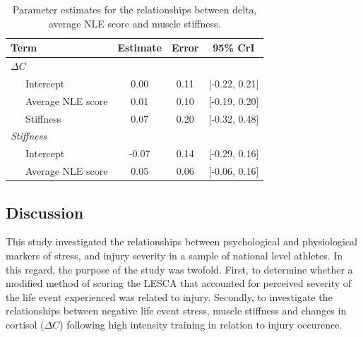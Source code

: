 \documentclass[man,floatsintext]{apa6}
\begin{document}
\begin{table}[H]

\begin{center}
\begin{threeparttable}

\caption{\label{tab:datatab2}Parameter estimates for the relationships between delta, average NLE score and muscle stiffness.}

\begin{tabular}{lccc}
\toprule
Term & Estimate & Error & 95\% CrI\\
\midrule
$\Delta C$ &  &  & \\
\ \ \ Intercept & 0.00 & 0.11 & [-0.22, 0.21]\\
\ \ \ Average NLE score & 0.01 & 0.10 & [-0.19, 0.20]\\
\ \ \ Stiffness & 0.07 & 0.20 & [-0.32, 0.48]\\
\textit{Stiffness} &  &  & \\
\ \ \ Intercept & -0.07 & 0.14 & [-0.29, 0.16]\\
\ \ \ Average NLE score & 0.05 & 0.06 & [-0.06, 0.16]\\
\bottomrule
\end{tabular}

\end{threeparttable}
\end{center}

\end{table}

\hypertarget{discussion-1}{%
\subsection{Discussion}\label{discussion-1}}

This study investigated the relationships between psychological and physiological markers of stress, and injury severity in a sample of national level athletes.
In this regard, the purpose of the study was twofold.
First, to determine whether a modified method of scoring the LESCA that accounted for perceived severity of the life event experienced was related to injury.
Secondly, to investigate the relationships between negative life event stress, muscle stiffness and changes in cortisol (\(\Delta C\)) following high intensity training in relation to injury occurence.
\end{document}
